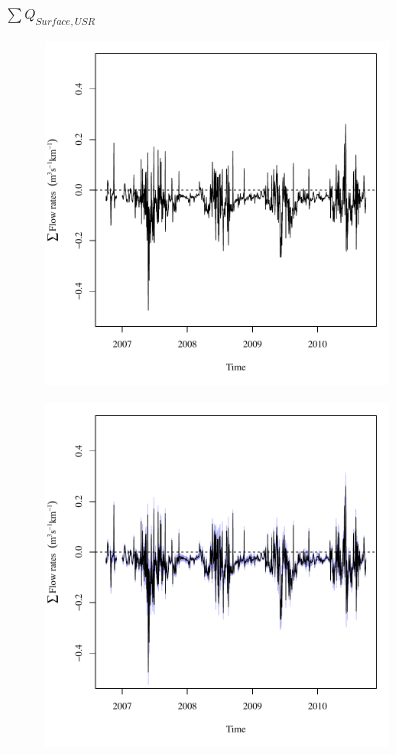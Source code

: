 \subfiguretop
\begin{landscape}
	\begin{figure}
		\centering
		$ \displaystyle \sum Q_{Surface,USR} $
		\begin{subfigure}{0.7\textwidth}
			\centering
			\includegraphics[width=\tableCustomSize]{"Figures/Results_USR/Deterministic/Balance Water - flow"}
		\end{subfigure}%
		\begin{subfigure}{0.7\textwidth}
			\centering
			\includegraphics[width=\tableCustomSize]{"Figures/Results_USR/Stochastic/Balance Water - flow"}

\end{subfigure}
\end{figure}
\end{landscape}
